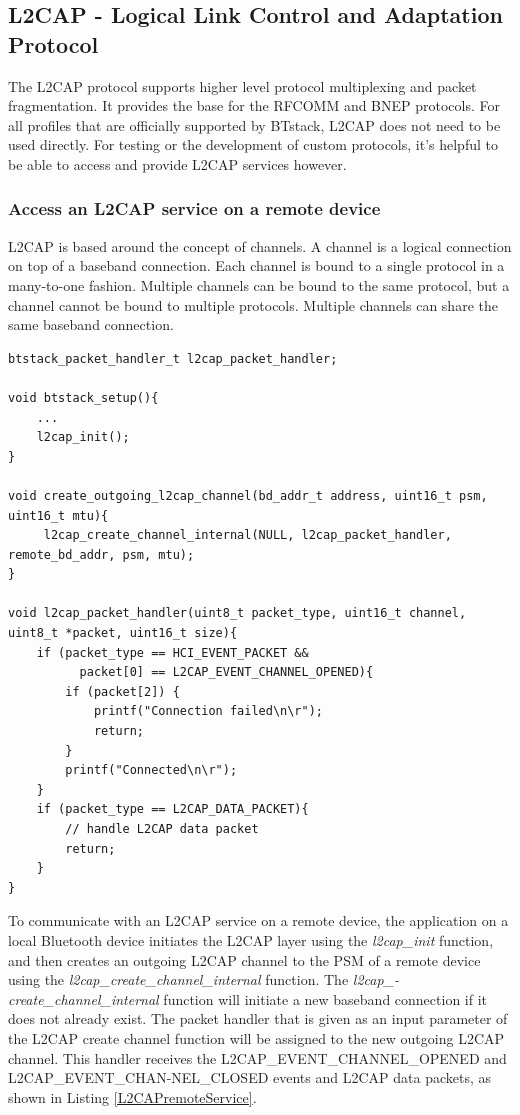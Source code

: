 \subsection{L2CAP -  Logical Link Control and Adaptation Protocol}
The L2CAP protocol supports higher level protocol multiplexing and packet fragmentation. It provides the base for the RFCOMM and BNEP protocols. For all profiles that are officially supported by BTstack, L2CAP does not need to be used directly. For testing or the development of custom protocols, it's helpful to be able to access and provide L2CAP services however.

\subsubsection{Access an L2CAP service on a remote device}
L2CAP is based around the concept of channels. A channel is a logical connection on top of a baseband connection. Each channel is bound to a single protocol in a many-to-one fashion. Multiple channels can be bound to the same protocol, but a channel cannot be bound to multiple protocols. Multiple channels can share the same baseband connection.

\begin{lstlisting}[caption=L2CAP handler for outgoing L2CAP channel.,label=L2CAPremoteService]
btstack_packet_handler_t l2cap_packet_handler;

void btstack_setup(){
    ...
    l2cap_init();
}

void create_outgoing_l2cap_channel(bd_addr_t address, uint16_t psm, uint16_t mtu){
     l2cap_create_channel_internal(NULL, l2cap_packet_handler, remote_bd_addr, psm, mtu);
}

void l2cap_packet_handler(uint8_t packet_type, uint16_t channel, uint8_t *packet, uint16_t size){
    if (packet_type == HCI_EVENT_PACKET &&
          packet[0] == L2CAP_EVENT_CHANNEL_OPENED){
        if (packet[2]) {
            printf("Connection failed\n\r");
            return;
        }
        printf("Connected\n\r");
    }
    if (packet_type == L2CAP_DATA_PACKET){
        // handle L2CAP data packet
        return;
    }
}
\end{lstlisting}

To communicate with an L2CAP service on a remote device, the application on a local Bluetooth device initiates the L2CAP layer using the \emph{l2cap\_init} function, and then creates an outgoing L2CAP channel to the PSM of a remote device using the \emph{l2cap\_create\_channel\_internal} function. The  \emph{l2cap\_-create\_channel\_internal} function will initiate a new baseband connection if it does not already exist. The packet handler that is given as an input parameter of the L2CAP create channel function will be assigned to the new outgoing L2CAP channel. This handler receives the L2CAP\_EVENT\_CHANNEL\_OPENED and L2CAP\_EVENT\_CHAN-NEL\_CLOSED events and L2CAP data packets, as shown in Listing \ref{L2CAPremoteService}.


